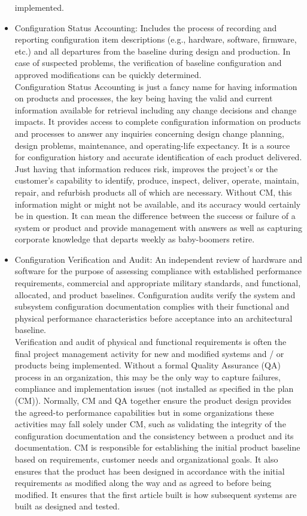 \documentclass{article}
\begin{document}
\begin{itemize}
    implemented.
    \item Configuration Status Accounting:
    Includes the process of recording and reporting configuration item descriptions (e.g., hardware, software, firmware, etc.) and all departures
    from the baseline during design and production. In case of suspected problems, the verification of baseline configuration and approved modifications can be quickly determined. \\
    Configuration Status Accounting is just a fancy name for having information on products
    and processes, the key being having the valid and current information available for
    retrieval including any change decisions and change impacts. It provides access to
    complete configuration information on products and processes to answer any inquiries
    concerning design change planning, design problems, maintenance, and operating-life
    expectancy. It is a source for configuration history and accurate identification of each
    product delivered. Just having that information reduces risk, improves the project’s or
    the customer’s capability to identify, produce, inspect, deliver, operate, maintain, repair,
    and refurbish products all of which are necessary. Without CM, this information might
    or might not be available, and its accuracy would certainly be in question. It can mean
    the difference between the success or failure of a system or product and provide
    management with answers as well as capturing corporate knowledge that departs weekly
    as baby-boomers retire.
    \item Configuration Verification and Audit:
    An independent review of hardware and software for the purpose of assessing compliance with established performance requirements,
    commercial and appropriate military standards, and functional, allocated, and product baselines. Configuration audits verify the system and subsystem configuration documentation
    complies with their functional and physical performance characteristics before acceptance into an architectural baseline. \\
    Verification and audit of physical and functional requirements is often the final project
    management activity for new and modified systems and / or products being implemented.
    Without a formal Quality Assurance (QA) process in an organization, this may be the
    only way to capture failures, compliance and implementation issues (not installed as
    specified in the plan (CM)). Normally, CM and QA together ensure the product design
    provides the agreed-to performance capabilities but in some organizations these activities
    may fall solely under CM, such as validating the integrity of the configuration
    documentation and the consistency between a product and its documentation.
    CM is responsible for establishing the initial
    product baseline based on requirements, customer needs and organizational goals. It also
    ensures that the product has been designed in accordance with the initial requirements as
    modified along the way and as agreed to before being modified. It ensures that the first
    article built is how subsequent systems are built as designed and tested.
\end{itemize}
\end{document}
